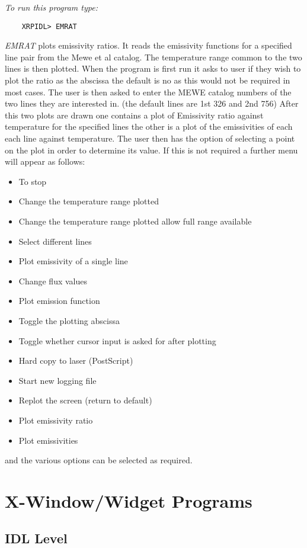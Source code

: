 {{{{\em To run this program type:}
\begin{verbatim}
    XRPIDL> EMRAT 
\end{verbatim}
{\em EMRAT} plots emissivity ratios. It reads the emissivity functions for a 
specified line pair from the Mewe et al catalog. The temperature range common to
the two lines is then plotted.      
When the program is first run it asks to user if they wish to plot the ratio as
the abscissa the default is no as this would not be required in most cases.
The user is then asked to enter the MEWE catalog numbers of the two lines
they are interested in. (the default lines are 1st 326 and 2nd 756) 
After this two plots are drawn one contains a plot of Emissivity ratio against 
temperature for the specified lines the other is a plot of the emissivities of each
each line against temperature.
The user then has the option of selecting a point on the plot in order to
determine its value. If this is not required a further menu will appear as 
follows:
\begin{itemize}
\item  To stop
\item  Change the temperature range plotted 
\item  Change the temperature range plotted allow full range available
\item  Select different lines
\item  Plot emissivity of a single line
\item  Change flux values 
\item  Plot emission function
\item  Toggle the plotting abscissa
\item  Toggle whether cursor input is asked for after plotting
\item  Hard copy to laser (PostScript)
\item  Start new logging file 
\item  Replot the screen (return to default)
\item  Plot emissivity ratio
\item  Plot emissivities
\end{itemize}
and the various options can be selected as required. 

\newpage 

\section{X-Window/Widget Programs}

\subsection{IDL Level}

}}}
